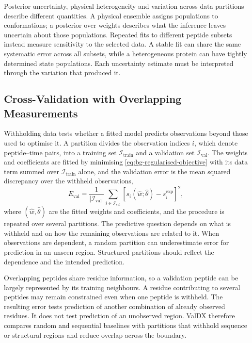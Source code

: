 Posterior uncertainty, physical heterogeneity and variation across data partitions describe different quantities. A physical ensemble assigns populations to conformations; a posterior over weights describes what the inference leaves uncertain about those populations.\supercite{bmsb2012ch12} Repeated fits to different peptide subsets instead measure sensitivity to the selected data. A stable fit can share the same systematic error across all subsets, while a heterogeneous protein can have tightly determined state populations. Each uncertainty estimate must be interpreted through the variation that produced it.

\subsection{Cross-Validation with Overlapping Measurements}
\label{sec:bg-cross-validation}

Withholding data tests whether a fitted model predicts observations beyond those used to optimise it. A partition divides the observation indices $i$, which denote peptide--time pairs, into a training set $\mathcal{I}_{\text{train}}$ and a validation set $\mathcal{I}_{\text{val}}$. The weights and coefficients are fitted by minimising \cref{eq:bg-regularised-objective} with its data term summed over $\mathcal{I}_{\text{train}}$ alone, and the validation error is the mean squared discrepancy over the withheld observations,
\begin{equation}
    E_{\text{val}}=\frac{1}{|\mathcal{I}_{\text{val}}|}\sum_{i\in\mathcal{I}_{\text{val}}}
    \left[s_i(\hat w;\hat\theta)-s_i^{\text{exp}}\right]^2,
    \label{eq:bg-validation-error}
\end{equation}
where $(\hat w,\hat\theta)$ are the fitted weights and coefficients, and the procedure is repeated over several partitions. The predictive question depends on what is withheld and on how the remaining observations are related to it. When observations are dependent, a random partition can underestimate error for prediction in an unseen region. Structured partitions should reflect the dependence and the intended prediction.\supercite{robertsCrossvalidationStrategiesData2017}

Overlapping peptides share residue information, so a validation peptide can be largely represented by its training neighbours. A residue contributing to several peptides may remain constrained even when one peptide is withheld. The resulting error tests prediction of another combination of already observed residues. It does not test prediction of an unobserved region. ValDX therefore compares random and sequential baselines with partitions that withhold sequence or structural regions and reduce overlap across the boundary.\supercite{siddiquiFrameworkTestingStructural2026}


